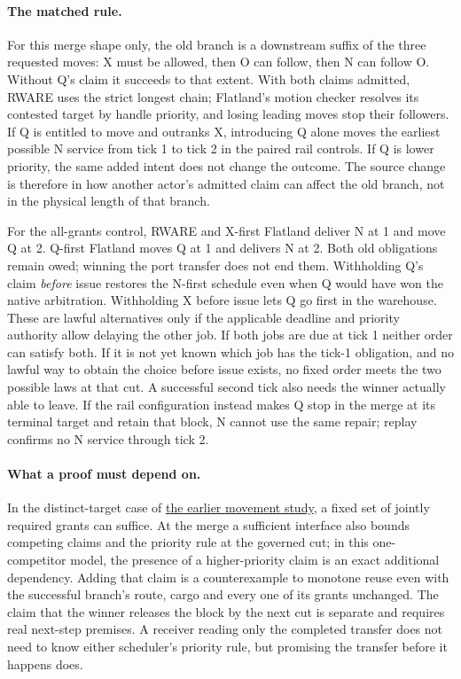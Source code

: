 \documentclass[11pt]{article}
\begin{document}
\paragraph{The matched rule.}
For this merge shape only, the old branch is a downstream suffix of the three requested moves: X must be allowed, then O can follow, then N can follow O. Without Q's claim it succeeds to that extent. With both claims admitted, RWARE uses the strict longest chain; Flatland's motion checker resolves its contested target by handle priority, and losing leading moves stop their followers. If Q is entitled to move and outranks X, introducing Q alone moves the earliest possible N service from tick 1 to tick 2 in the paired rail controls. If Q is lower priority, the same added intent does not change the outcome. The source change is therefore in how another actor's admitted claim can affect the old branch, not in the physical length of that branch.

For the all-grants control, RWARE and X-first Flatland deliver N at 1 and move Q at 2. Q-first Flatland moves Q at 1 and delivers N at 2. Both old obligations remain owed; winning the port transfer does not end them. Withholding Q's claim \emph{before} issue restores the N-first schedule even when Q would have won the native arbitration. Withholding X before issue lets Q go first in the warehouse. These are lawful alternatives only if the applicable deadline and priority authority allow delaying the other job. If both jobs are due at tick 1 neither order can satisfy both. If it is not yet known which job has the tick-1 obligation, and no lawful way to obtain the choice before issue exists, no fixed order meets the two possible laws at that cut. A successful second tick also needs the winner actually able to leave. If the rail configuration instead makes Q stop in the merge at its terminal target and retain that block, N cannot use the same repair; replay confirms no N service through tick 2.

\paragraph{What a proof must depend on.}
In the distinct-target case of \href{https://github.com/eternal-november/eos-research-programmes/pull/428}{the earlier movement study}, a fixed set of jointly required grants can suffice. At the merge a sufficient interface also bounds competing claims and the priority rule at the governed cut; in this one-competitor model, the presence of a higher-priority claim is an exact additional dependency. Adding that claim is a counterexample to monotone reuse even with the successful branch's route, cargo and every one of its grants unchanged. The claim that the winner releases the block by the next cut is separate and requires real next-step premises. A receiver reading only the completed transfer does not need to know either scheduler's priority rule, but promising the transfer before it happens does.
\end{document}
